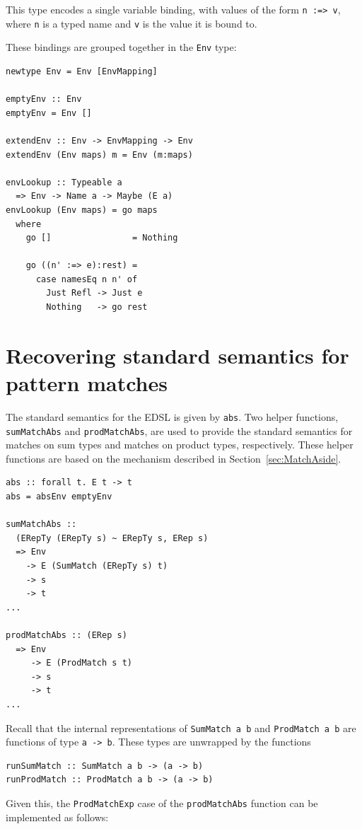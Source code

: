 \documentclass[runningheads, a4paper]{llncs}
\newcommand{\ttt}{\texttt}
\begin{document}
This type encodes a single variable binding, with values of the form
\ttt{n :=> v}, where \ttt{n} is a typed name and \ttt{v} is the value it is bound to.

These bindings are grouped together in the \ttt{Env} type:
\begin{lstlisting}
newtype Env = Env [EnvMapping]

emptyEnv :: Env
emptyEnv = Env []

extendEnv :: Env -> EnvMapping -> Env
extendEnv (Env maps) m = Env (m:maps)

envLookup :: Typeable a
  => Env -> Name a -> Maybe (E a)
envLookup (Env maps) = go maps
  where
    go []                = Nothing

    go ((n' :=> e):rest) =
      case namesEq n n' of
        Just Refl -> Just e
        Nothing   -> go rest
\end{lstlisting}


\section{Recovering standard semantics for pattern matches}
\label{sec:StdSemantics}

The standard semantics for the EDSL is given by \ttt{abs}. Two helper
functions, \ttt{sumMatchAbs} and \ttt{prodMatchAbs}, are used to provide
the standard semantics for matches on sum types and matches on product
types, respectively. These helper functions are based on the mechanism
described in Section~\ref{sec:MatchAside}.

\begin{lstlisting}
abs :: forall t. E t -> t
abs = absEnv emptyEnv

sumMatchAbs ::
  (ERepTy (ERepTy s) ~ ERepTy s, ERep s)
  => Env
    -> E (SumMatch (ERepTy s) t)
    -> s
    -> t
...

prodMatchAbs :: (ERep s)
  => Env
     -> E (ProdMatch s t)
     -> s
     -> t
...
\end{lstlisting}

Recall that the internal representations of \verb|SumMatch a b| and \verb|ProdMatch a b|
are functions of type \verb|a -> b|. These types are unwrapped by the functions

\begin{lstlisting}
runSumMatch :: SumMatch a b -> (a -> b)
runProdMatch :: ProdMatch a b -> (a -> b)
\end{lstlisting}

Given this, the \verb|ProdMatchExp| case of the \verb|prodMatchAbs| function can be
implemented as follows:
\end{document}
